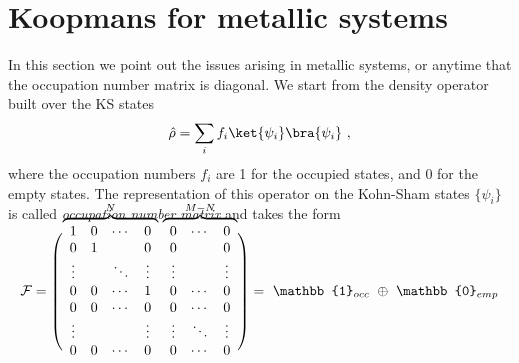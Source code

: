 \chapter{Koopmans for metallic systems\label{app:koopmans-metals}}
In this section we point out the issues arising in metallic systems, or anytime that the occupation number matrix is diagonal. We start from the density operator built over the KS states
%
\begin{equation}
    \hat{\rho} = \sum_i f_i \ket{\psi_i} \bra{\psi_i} \ ,
    \label{eq:density-matrix-diag}
\end{equation}
%
where the occupation numbers $f_i$ are 1 for the occupied states, and 0 for the empty states. The representation of this operator on the Kohn-Sham states $\{ \psi_i \}$ is called \emph{occupation number matrix} and takes the form
%
\begin{equation}
    \mathcal{F} = 
    \left(\vphantom{\begin{array}{c}1\\1\\1\\1\\1\\1\\1\end{array}}
    \smash{\overbrace{
        \begin{array}{cccc}
            1      & 0      & \cdots & 0      \\
            0      & 1      &        & 0      \\
            \vdots &        & \ddots & \vdots \\
            0      & 0      & \cdots & 1      \\
            0      & 0      & \cdots & 0      \\
            \vdots &        &        & \vdots \\
            0      & 0      & \cdots & 0      \\
        \end{array}
        }^{N}} \ 
        \smash{\overbrace{
        \begin{array}{ccc}
            0      & \cdots & 0      \\
            0      &        & 0      \\
            \vdots &        & \vdots \\
            0      & \cdots & 0      \\
            0      & \cdots & 0      \\
            \vdots & \ddots & \vdots \\
            0      & \cdots & 0      \\
        \end{array}
        }^{M-N}}
    \right)
    = \ \mathbb{1}_{occ} \ \oplus \ \mathbb{0}_{emp}
    \label{eq:occ-num-matrix}
\end{equation}
